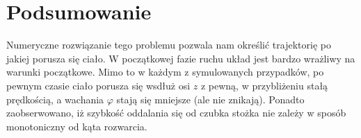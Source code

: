 \documentclass[11pt]{article}
\begin{document}
\section*{Podsumowanie}
Numeryczne rozwiązanie tego problemu pozwala nam określić trajektorię po jakiej porusza się ciało. W początkowej 
fazie ruchu układ jest bardzo wrażliwy na warunki początkowe. Mimo to w każdym z symulowanych przypadków, po pewnym czasie
ciało porusza się wsdłuż osi $z$ z pewną, w przybliżeniu stałą prędkością, a wachania $\varphi$ stają się mniejsze (ale nie znikają).
Ponadto zaobserwowano, iż szybkość oddalania się od czubka stożka nie zależy w sposób monotoniczny od kąta rozwarcia.



%
\end{document}
